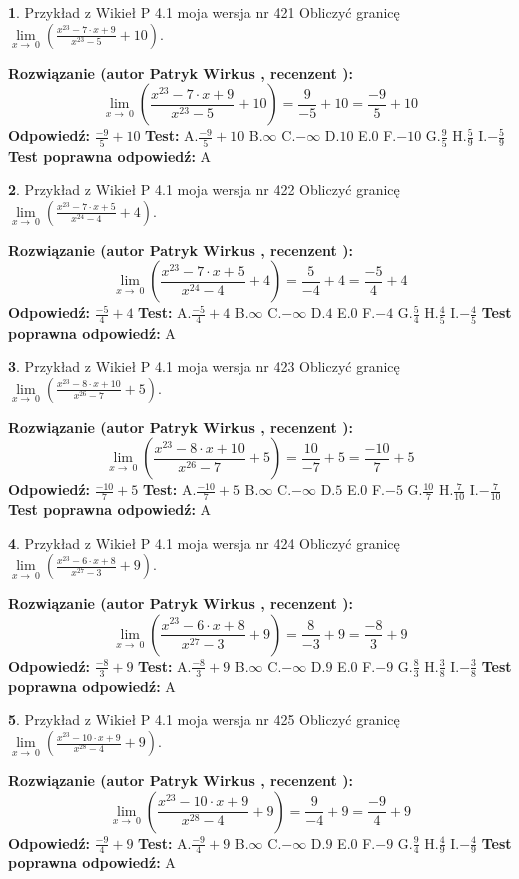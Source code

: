 \documentclass[12pt, a4paper]{article}
\theoremstyle{definition} %
\newtheorem{zad}{}
\newcommand{\zadStart}[1]{\begin{zad}#1\newline}
\newcommand{\zadStop}{\end{zad}}
\newcommand{\rozwStart}[2]{\noindent \textbf{Rozwiązanie (autor #1 , recenzent #2): }\newline}
\newcommand{\rozwStop}{\newline}
\newcommand{\odpStart}{\noindent \textbf{Odpowiedź:}\newline}
\newcommand{\odpStop}{\newline}
\newcommand{\testStart}{\noindent \textbf{Test:}\newline}
\newcommand{\testStop}{\newline}
\newcommand{\kluczStart}{\noindent \textbf{Test poprawna odpowiedź:}\newline}
\newcommand{\kluczStop}{\newline}
\begin{document}
\zadStart{Przykład z Wikieł P 4.1 moja wersja nr 421}
Obliczyć granicę $\lim\limits_{x\to\ 0}(\frac{x^{23}-7 \cdot x +9}{x^{23}-5}+10)$.
\zadStop
\rozwStart{Patryk Wirkus}{}
$$\lim\limits_{x\to\ 0}(\frac{x^{23}-7 \cdot x +9}{x^{23}-5}+10)=\frac{9}{-5}+10=\frac{-9}{5}+10$$
\rozwStop
\odpStart
$\frac{-9}{5}+10$
\odpStop
\testStart
A.$\frac{-9}{5}+10$
B.$\infty$
C.$-\infty$
D.$10$
E.$0$
F.$-10$
G.$\frac{9}{5}$
H.$\frac{5}{9}$
I.$-\frac{5}{9}$
\testStop
\kluczStart
A
\kluczStop



\zadStart{Przykład z Wikieł P 4.1 moja wersja nr 422}
Obliczyć granicę $\lim\limits_{x\to\ 0}(\frac{x^{23}-7 \cdot x +5}{x^{24}-4}+4)$.
\zadStop
\rozwStart{Patryk Wirkus}{}
$$\lim\limits_{x\to\ 0}(\frac{x^{23}-7 \cdot x +5}{x^{24}-4}+4)=\frac{5}{-4}+4=\frac{-5}{4}+4$$
\rozwStop
\odpStart
$\frac{-5}{4}+4$
\odpStop
\testStart
A.$\frac{-5}{4}+4$
B.$\infty$
C.$-\infty$
D.$4$
E.$0$
F.$-4$
G.$\frac{5}{4}$
H.$\frac{4}{5}$
I.$-\frac{4}{5}$
\testStop
\kluczStart
A
\kluczStop



\zadStart{Przykład z Wikieł P 4.1 moja wersja nr 423}
Obliczyć granicę $\lim\limits_{x\to\ 0}(\frac{x^{23}-8 \cdot x +10}{x^{26}-7}+5)$.
\zadStop
\rozwStart{Patryk Wirkus}{}
$$\lim\limits_{x\to\ 0}(\frac{x^{23}-8 \cdot x +10}{x^{26}-7}+5)=\frac{10}{-7}+5=\frac{-10}{7}+5$$
\rozwStop
\odpStart
$\frac{-10}{7}+5$
\odpStop
\testStart
A.$\frac{-10}{7}+5$
B.$\infty$
C.$-\infty$
D.$5$
E.$0$
F.$-5$
G.$\frac{10}{7}$
H.$\frac{7}{10}$
I.$-\frac{7}{10}$
\testStop
\kluczStart
A
\kluczStop



\zadStart{Przykład z Wikieł P 4.1 moja wersja nr 424}
Obliczyć granicę $\lim\limits_{x\to\ 0}(\frac{x^{23}-6 \cdot x +8}{x^{27}-3}+9)$.
\zadStop
\rozwStart{Patryk Wirkus}{}
$$\lim\limits_{x\to\ 0}(\frac{x^{23}-6 \cdot x +8}{x^{27}-3}+9)=\frac{8}{-3}+9=\frac{-8}{3}+9$$
\rozwStop
\odpStart
$\frac{-8}{3}+9$
\odpStop
\testStart
A.$\frac{-8}{3}+9$
B.$\infty$
C.$-\infty$
D.$9$
E.$0$
F.$-9$
G.$\frac{8}{3}$
H.$\frac{3}{8}$
I.$-\frac{3}{8}$
\testStop
\kluczStart
A
\kluczStop



\zadStart{Przykład z Wikieł P 4.1 moja wersja nr 425}
Obliczyć granicę $\lim\limits_{x\to\ 0}(\frac{x^{23}-10 \cdot x +9}{x^{28}-4}+9)$.
\zadStop
\rozwStart{Patryk Wirkus}{}
$$\lim\limits_{x\to\ 0}(\frac{x^{23}-10 \cdot x +9}{x^{28}-4}+9)=\frac{9}{-4}+9=\frac{-9}{4}+9$$
\rozwStop
\odpStart
$\frac{-9}{4}+9$
\odpStop
\testStart
A.$\frac{-9}{4}+9$
B.$\infty$
C.$-\infty$
D.$9$
E.$0$
F.$-9$
G.$\frac{9}{4}$
H.$\frac{4}{9}$
I.$-\frac{4}{9}$
\testStop
\kluczStart
A
\kluczStop
\end{document}
